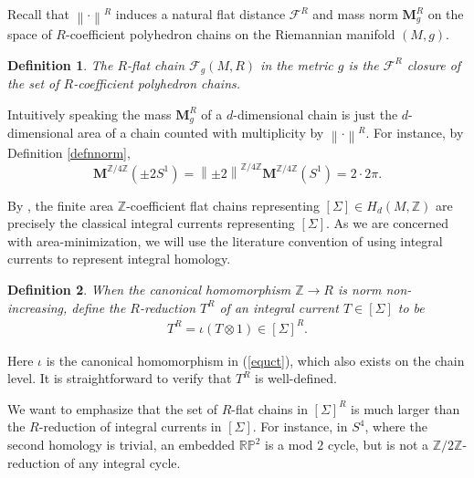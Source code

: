 \documentclass[11pt,a4paper]{amsart}
\numberwithin{equation}{section}
\newcommand{\Si}{\Sigma}
\newcommand{\ms}{\mathbf{M}}
\newcommand{\no}[1]{\left\lVert#1\right\rVert}
\newcommand{\ts}{\otimes}
\newcommand{\Z}{\mathbb{Z}}
\theoremstyle{plain}
\newtheorem{defn}{Definition}[subsection]
\theoremstyle{definition}
\numberwithin{equation}{subsection}
\begin{document}
	Recall \cite{WFfc,BWrc,BWdt} that $\no{\cdot}^R$ induces a natural flat distance $\mathcal{F}^R$ and mass norm $\ms^R_g$ on the space of $R$-coefficient polyhedron chains on the Riemannian manifold $(M,g)$. 
	\begin{defn}\label{defnfc}
		The $R$-flat chain $\mathcal{F}_g(M,R)$ in the metric $g$ is the $\mathcal{F}^R$ closure of the set of $R$-coefficient polyhedron chains.
	\end{defn} Intuitively speaking the mass $\ms_g^R$ of a $d$-dimensional chain is just the $d$-dimensional area of a chain counted with multiplicity by $\no{\cdot}^R.$ For instance, by Definition \ref{defnnorm}, $$\ms^{\Z/4\Z}(\pm 2 S^1)=\no{\pm 2}^{\Z/4\Z}\ms^{\Z/4\Z}(S^1)=2\cdot 2\pi.$$
	
	By \cite[Section 4.2.16]{HF}, the finite area $\Z$-coefficient flat chains representing $[\Si]\in H_d(M,\Z)$ are precisely the classical integral currents representing $[\Si]$. As we are concerned with area-minimization, we will use the literature convention of using integral currents to represent integral homology.
	\begin{defn}When the canonical homomorphism $\Z\to R$ is norm non-increasing, define the $R$-reduction $T^R$ of an integral current $T\in[\Si]$ to be
		\begin{align*}
			T^R=\iota(T\ts 1)\in [\Si]^R.
		\end{align*}
	\end{defn}
	Here $\iota$ is the canonical homomorphism in (\ref{equct}), which also exists on the chain level. It is straightforward to verify that $T^R$ is well-defined.
	
	We want to emphasize that the set of $R$-flat chains in $[\Si]^R$ is much larger than the $R$-reduction of integral currents in $[\Si]$. For instance, in $S^4$, where the second homology is trivial, an embedded $\mathbb{RP}^2$ is a mod $2$ cycle, but is not a $\Z/2\Z$-reduction of any integral cycle.
	
\end{document}
